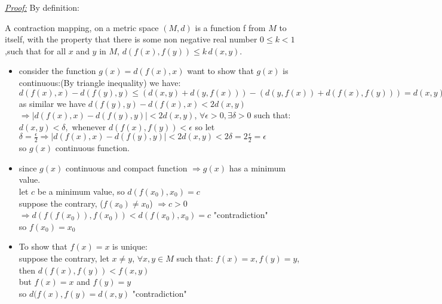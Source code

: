 \documentclass{amsbook}
\begin{document}
\begin{tcolorbox}[enhanced,attach boxed title to top center={yshift=-3mm,yshifttext=-1mm},
  colback=blue!5!white,colframe=blue!75!black,colbacktitle=red!80!black,
  title=Exercise 42.12:,fonttitle=\bfseries,
  boxed title style={size=small,colframe=red!50!black} ]
     \textit{\color{blue}\underline{Proof:}}
     By definition:
\begin{tcolorbox}[colback=red!5!white,colframe=red!75!black]
     A contraction mapping, on a metric space $(M,d)$ is a function f from $M$ to itself, with the property that
     there is some non negative real number ${ 
     0\leq k<1}$,such that for all $x$ and $y$ in $M$, ${d(f(x),f(y))\leq k\,d(x,y).}$
 \end{tcolorbox}
 \begin{itemize}
     \item consider the function $g(x)=d(f(x),x)$ want to show that $g(x)$ is continuous:{\color{red}(By 
     triangle inequality)} we have:\\
     $d(f(x),x)-d(f(y),y)\leq (d(x,y)+d(y,f(x)))-(d(y,f(x))+d(f(x),f(y)))=d(x,y)-d(f(x),f(y))<2d(x,y)$\\
     as similar we have $d(f(y),y)-d(f(x),x)<2d(x,y)$\\
     $\Rightarrow |d(f(x),x)-d(f(y),y)|<2d(x,y)$, $\forall\epsilon>0,\exists\delta>0$ such that:\\
     $d(x,y)<\delta,$ whenever $d(f(x),f(y))<\epsilon$ so let $\delta=\frac{\epsilon}{2}\Rightarrow 
     |d(f(x),x)-d(f(y),y)|<2d(x,y)<2\delta=2\frac{\epsilon}{2}=\epsilon$\\
     so {\color{red}$g(x)$ continuous function.}
     \item since $g(x)$ continuous and compact function $\Rightarrow g(x)$ has a minimum value.\\
     let $c$ be a minimum value, so $d(f(x_0),x_0)=c$\\
     suppose the contrary, ($f(x_0)\neq x_0$) $\Rightarrow c>0$\\
     $\Rightarrow d(f(f(x_0)),f(x_0))<d(f(x_0),x_0)=c$ {\color{red}"contradiction"}\\
     so $f(x_0)=x_0$
     \item To show that $f(x)=x$ is unique:\\
     suppose the contrary, let $x\neq y$, $\forall x,y\in M$ such that: $f(x)=x,f(y)=y$, then 
     $d(f(x),f(y))<f(x,y)$\\
     but $f(x)=x$ and $f(y)=y$\\
     so $d(f(x),f(y)=d(x,y)$ {\color{red}"contradiction"}\\
 \end{itemize}
\end{tcolorbox}
\end{document}
